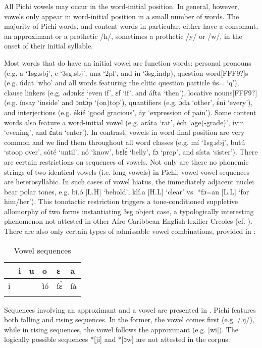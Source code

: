 All Pichi vowels may occur in the word-initial position. In general, however, vowels only appear in word-initial position in a small number of words. The majority of Pichi words, and content words in particular, either have a consonant, an approximant or a prothetic /h/, sometimes a prothetic /y/ or /w/, in the onset of their initial syllable. 


Most words that do have an initial vowel are function words: personal pronouns (e.g. a ‘1sg.sbj’, e ‘3sg.sbj’, una ‘2pl’, and ín ‘3sg.indp), question word[FFF9?]s (e.g. údat ‘who’ and all words featuring the clitic question particle ús= ‘q’), clause linkers (e.g. adɔnkɛ́ ‘even if’, ɛf ‘if’, and áfta ‘then’), locative nouns[FFF9?] (e.g. ínsay ‘inside’ and ɔntɔ́p ‘(on)top’), quantifiers (e.g. ɔ́da ‘other’, ɛ́ni ‘every’), and interjections (e.g. ékié ‘good gracious’, áy ‘expression of pain’). Some content words also feature a word-initial vowel (e.g. aráta ‘rat’, éch ‘age(-grade)’, ívin ‘evening’, and ɛ́nta ‘enter’). In contrast, vowels in word-final position are very common and we find them throughout all word classes (e.g. mí ‘1sg.sbj’, butú ‘stoop over’, sóté ‘until’, nó ‘know’, bɛlɛ́ ‘belly’, fɔ ‘prep’, and sísta ‘sister’). There are certain restrictions on sequences of vowels. Not only are there no phonemic strings of two identical vowels (i.e. long vowels) in Pichi; vowel-vowel sequences are heterosyllabic. In such cases of vowel hiatus, the immediately adjacent nuclei bear polar tones, e.g. bi.ó [L.H] ‘behold’, klí.a [H.L] ‘clear’ vs. *fɔ=an [L.L] ‘for him/her’). This tonotactic restriction triggers a tone-conditioned suppletive allomorphy of two forms instantiating 3sg object case, a typologically interesting phenomenon not attested in other Afro-Caribbean English-lexifier Creoles (cf. ). There are also only certain types of admissable vowel combinations, provided in :


\begin{table}
\caption{Vowel sequences}
\label{tab:key:2.9}

\begin{tabularx}{\textwidth}{XXXXXX}
\lsptoprule
 & i & u & o & ɛ & a\\
 \midrule
i &  &  & ìó & íɛ̀ & íà\\
\lspbottomrule
\end{tabularx}
\end{table}
Sequences involving an approximant and a vowel are presented in . Pichi features both falling and rising sequences. In the former, the vowel comes first (e.g. /ɔj/), while in rising sequences, the vowel follows the approximant (e.g. [wi]). The logically possible sequences *[ji] and *[ɔw] are not attested in the corpus:


